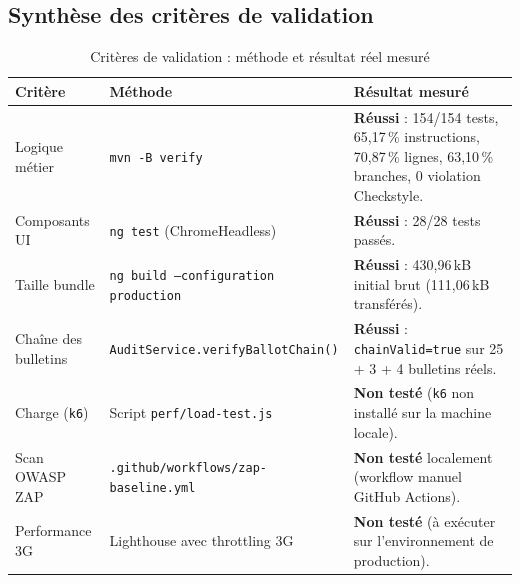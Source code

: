 \subsection{Synthèse des critères de validation}
\begin{table}[H]
\centering
\caption{Critères de validation : méthode et résultat réel mesuré}
\label{tab:criteres-validation}
\small
\begin{tabularx}{\textwidth}{@{}llX@{}}
\toprule
\rowcolor{uaszlight}
\textbf{Critère} & \textbf{Méthode} & \textbf{Résultat mesuré} \\
\midrule
Logique métier & \texttt{mvn -B verify} & \textbf{Réussi} : 154/154 tests, 65,17\,\% instructions, 70,87\,\% lignes, 63,10\,\% branches, 0 violation Checkstyle. \\
Composants UI & \texttt{ng test} (ChromeHeadless) & \textbf{Réussi} : 28/28 tests passés. \\
Taille bundle & \texttt{ng build --configuration production} & \textbf{Réussi} : 430,96\,kB initial brut (111,06\,kB transférés). \\
Chaîne des bulletins & \texttt{AuditService.verifyBallotChain()} & \textbf{Réussi} : \texttt{chainValid=true} sur 25 + 3 + 4 bulletins réels. \\
Charge (\texttt{k6}) & Script \texttt{perf/load-test.js} & \textbf{Non testé} (\texttt{k6} non installé sur la machine locale). \\
Scan OWASP ZAP & \texttt{.github/workflows/zap-baseline.yml} & \textbf{Non testé} localement (workflow manuel GitHub Actions). \\
Performance 3G & Lighthouse avec throttling 3G & \textbf{Non testé} (à exécuter sur l'environnement de production). \\
\bottomrule
\end{tabularx}
\end{table}

